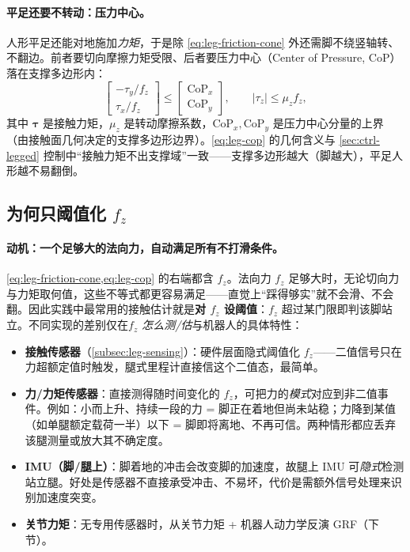\paragraph{平足还要不转动：压力中心。}
人形平足还能对地施加\emph{力矩}，于是除 \cref{eq:leg-friction-cone} 外还需脚不绕竖轴转、不翻边。前者要切向摩擦力矩受限、后者要压力中心（Center of Pressure, CoP）落在支撑多边形内：
\begin{equation}
  \begin{bmatrix}-\tau_y/f_z\\\tau_x/f_z\end{bmatrix}\le\begin{bmatrix}\mathrm{CoP}_x\\\mathrm{CoP}_y\end{bmatrix},\qquad |\tau_z|\le\mu_z f_z,
  \label{eq:leg-cop}
\end{equation}
其中 $\boldsymbol{\tau}$ 是接触力矩，$\mu_z$ 是转动摩擦系数，$\mathrm{CoP}_{x},\mathrm{CoP}_{y}$ 是压力中心分量的上界（由接触面几何决定的支撑多边形边界）。\cref{eq:leg-cop} 的几何含义与 \cref{sec:ctrl-legged} 控制中“接触力矩不出支撑域”一致——支撑多边形越大（脚越大），平足人形越不易翻倒。

\subsection{为何只阈值化 $f_z$}
\label{subsec:leg-fz}

\paragraph{动机：一个足够大的法向力，自动满足所有不打滑条件。}
\cref{eq:leg-friction-cone,eq:leg-cop} 的右端都含 $f_z$。法向力 $f_z$ 足够大时，无论切向力与力矩取何值，这些不等式都更容易满足——直觉上“踩得够实”就不会滑、不会翻。因此实践中最常用的接触估计就是\textbf{对 $f_z$ 设阈值}：$f_z$ 超过某门限即判该脚站立。不同实现的差别仅在\emph{$f_z$ 怎么测/估}与机器人的具体特性：
\begin{itemize}
  \item \textbf{接触传感器}（\cref{subsec:leg-sensing}）：硬件层面隐式阈值化 $f_z$——二值信号只在力超额定值时触发，腿式里程计直接信这个二值态，最简单。
  \item \textbf{力/力矩传感器}：直接测得随时间变化的 $f_z$，可把力的\emph{模式}对应到非二值事件。例如：小而上升、持续一段的力 = 脚正在着地但尚未站稳；力降到某值（如单腿额定载荷一半）以下 = 脚即将离地、不再可信。两种情形都应丢弃该腿测量或放大其不确定度\cite{carlone2026handbook}。
  \item \textbf{IMU（脚/腿上）}：脚着地的冲击会改变脚的加速度，故腿上 IMU 可\emph{隐式}检测站立腿。好处是传感器不直接承受冲击、不易坏，代价是需额外信号处理来识别加速度突变。
  \item \textbf{关节力矩}：无专用传感器时，从关节力矩 + 机器人动力学反演 GRF（下节）。
\end{itemize}

